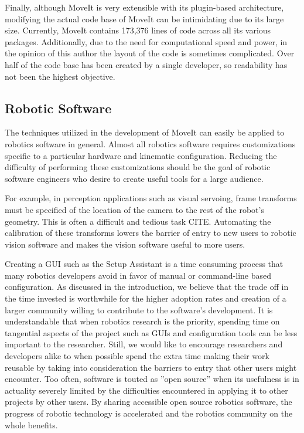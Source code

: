 \documentclass[10pt,journal,compsoc]{joser1}
\begin{document}
{Finally, although MoveIt is very extensible with its plugin-based architecture, modifying the actual code base of MoveIt can be intimidating due to its large size. Currently, MoveIt contains 173,376	lines of code across all its various packages. Additionally, due to the need for computational speed and power, in the opinion of this author the layout of the code is sometimes complicated. Over half of the code base has been created by a single developer, so readability has not been the highest objective. 

\subsection{Robotic Software}
\label{sec::robotic_discussion}

The techniques utilized in the development of MoveIt can easily be applied to robotics software in general. Almost all robotics software requires customizations specific to a particular hardware and kinematic configuration. Reducing the difficulty of performing these customizations should be the goal of robotic software engineers who desire to create useful tools for a large audience. 

For example, in perception applications such as visual servoing, frame transforms must be specified of the location of the camera to the rest of the robot's geometry. This is often a difficult and tedious task CITE. Automating the calibration of these transforms lowers the barrier of entry to new users to robotic vision software and makes the vision software useful to more users.

Creating a GUI such as the Setup Assistant is a time consuming process that many robotics developers avoid in favor of manual or command-line based configuration. As discussed in the introduction, we believe that the trade off in the time invested is worthwhile for the higher adoption rates and creation of a larger community willing to contribute to the software's development. It is understandable that when robotics research is the priority, spending time on tangential aspects of the project such as GUIs and configuration tools can be less important to the researcher. Still, we would like to encourage researchers and developers alike to when possible spend the extra time making their work reusable by taking into consideration the barriers to entry that other users might encounter. Too often, software is touted as ''open source'' when its usefulness is in actuality severely limited by the difficulties encountered in applying it to other projects by other users. By sharing accessible open source robotics 
software, the progress of robotic technology is accelerated and the robotics community on the whole benefits.

}
\end{document}
